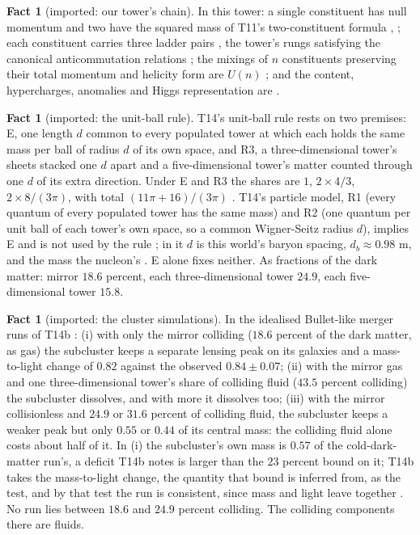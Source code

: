 \documentclass[11pt]{article}
\theoremstyle{definition}
\newtheorem{fact}[theorem]{Fact}
\begin{document}
\begin{fact}[imported: our tower's chain]\label{fact:chain}
In this tower: a single constituent has null momentum and two have the squared mass of T11's two-constituent formula \cite[Prop.~4.1]{ButlerT11}, \cite[Fact~2.1]{ButlerT12}; each constituent carries three ladder pairs \cite[Fact~2.2, Lem.~2.12]{ButlerT12}, the tower's rungs satisfying the canonical anticommutation relations \cite[Prop.~4.1]{ButlerT3}; the mixings of $n$ constituents preserving their total momentum and helicity form are $U(n)$ \cite[Prop.~3.1]{ButlerT12}; and the content, hypercharges, anomalies and Higgs representation are \cite[Thm.~4.1, Thm.~4.2, Prop.~5.3, Thm.~5.5, Prop.~9.22]{ButlerT12}.
\end{fact}

\begin{fact}[imported: the unit-ball rule]\label{fact:rule}
T14's unit-ball rule rests on two premises: E, one length $d$ common to every populated tower at which each holds the same mass per ball of radius $d$ of its own space, and R3, a three-dimensional tower's sheets stacked one $d$ apart and a five-dimensional tower's matter counted through one $d$ of its extra direction. Under E and R3 the shares are $1$, $2 \times 4/3$, $2 \times 8/(3\pi)$, with total $(11\pi + 16)/(3\pi)$ \cite[Prem.~7.2, Prem.~7.4, Prop.~7.6(i)]{ButlerT14}. T14's particle model, R1 (every quantum of every populated tower has the same mass) and R2 (one quantum per unit ball of each tower's own space, so a common Wigner-Seitz radius $d$), implies E and is not used by the rule \cite[Prem.~7.3, Prop.~7.6(ii)]{ButlerT14}; in it $d$ is this world's baryon spacing, $d_{b} \approx 0.98$ m, and the mass the nucleon's \cite[Rem.~7.9, Cor.~7.26]{ButlerT14}. E alone fixes neither. As fractions of the dark matter: mirror $18.6$ percent, each three-dimensional tower $24.9$, each five-dimensional tower $15.8$.
\end{fact}

\begin{fact}[imported: the cluster simulations]\label{fact:sims}
In the idealised Bullet-like merger runs of T14b \cite[Obs.~7.1, Table~3]{ButlerT14b}: (i) with only the mirror colliding ($18.6$ percent of the dark matter, as gas) the subcluster keeps a separate lensing peak on its galaxies and a mass-to-light change of $0.82$ against the observed $0.84 \pm 0.07$; (ii) with the mirror gas and one three-dimensional tower's share of colliding fluid ($43.5$ percent colliding) the subcluster dissolves, and with more it dissolves too; (iii) with the mirror collisionless and $24.9$ or $31.6$ percent of colliding fluid, the subcluster keeps a weaker peak but only $0.55$ or $0.44$ of its central mass: the colliding fluid alone costs about half of it. In (i) the subcluster's own mass is $0.57$ of the cold-dark-matter run's, a deficit T14b notes is larger than the $23$ percent bound on it; T14b takes the mass-to-light change, the quantity that bound is inferred from, as the test, and by that test the run is consistent, since mass and light leave together \cite[Obs.~7.1]{ButlerT14b}. No run lies between $18.6$ and $24.9$ percent colliding. The colliding components there are fluids.
\end{fact}
\end{document}
